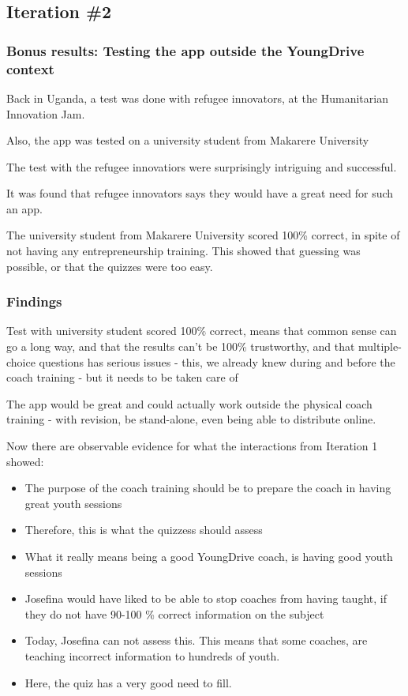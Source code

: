 \subsection{Iteration \#2}



\subsubsection{Bonus results: Testing the app outside the YoungDrive context}
Back in Uganda, a test was done with refugee innovators, at the Humanitarian Innovation Jam.

Also, the app was tested on a university student from Makarere University

The test with the refugee innovatiors were surprisingly intriguing and successful.

It was found that refugee innovators says they would have a great need for such an app.

The university student from Makarere University scored 100\% correct, in spite of not having any entrepreneurship training. This showed that guessing was possible, or that the quizzes were too easy.

\subsubsection{Findings}

Test with university student scored 100\% correct, means that common sense can go a long way, and that the results can't be 100\% trustworthy, and that multiple-choice questions has serious issues - this, we already knew during and before the coach training - but it needs to be taken care of

The app would be great and could actually work outside the physical coach training - with revision, be stand-alone, even being able to distribute online.

Now there are observable evidence for what the interactions from Iteration 1 showed:

\begin{itemize}
\item The purpose of the coach training should be to prepare the coach in having great youth sessions
\item Therefore, this is what the quizzess should assess
\item What it really means being a good YoungDrive coach, is having good youth sessions
\item Josefina would have liked to be able to stop coaches from having taught, if they do not have 90-100 \% correct information on the subject
\item Today, Josefina can not assess this. This means that some coaches, are teaching incorrect information to hundreds of youth.
\item Here, the quiz has a very good need to fill.
\end{itemize}

